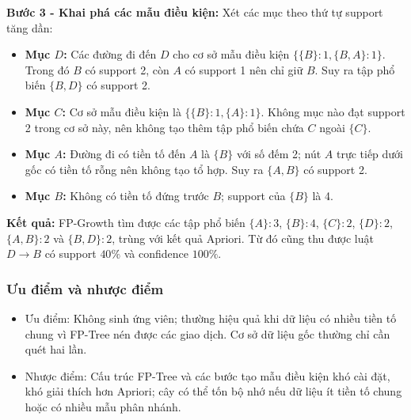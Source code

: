 \textbf{Bước 3 - Khai phá các mẫu điều kiện:} Xét các mục theo thứ tự support tăng dần:
\begin{itemize}
    \item \textbf{Mục $D$:} Các đường đi đến $D$ cho cơ sở mẫu điều kiện $\{\{B\}:1,\{B,A\}:1\}$. Trong đó $B$ có support 2, còn $A$ có support 1 nên chỉ giữ $B$. Suy ra tập phổ biến $\{B,D\}$ có support 2.
    \item \textbf{Mục $C$:} Cơ sở mẫu điều kiện là $\{\{B\}:1,\{A\}:1\}$. Không mục nào đạt support 2 trong cơ sở này, nên không tạo thêm tập phổ biến chứa $C$ ngoài $\{C\}$.
    \item \textbf{Mục $A$:} Đường đi có tiền tố đến $A$ là $\{B\}$ với số đếm 2; nút $A$ trực tiếp dưới gốc có tiền tố rỗng nên không tạo tổ hợp. Suy ra $\{A,B\}$ có support 2.
    \item \textbf{Mục $B$:} Không có tiền tố đứng trước $B$; support của $\{B\}$ là 4.
\end{itemize}

\textbf{Kết quả:} FP-Growth tìm được các tập phổ biến $\{A\}:3$, $\{B\}:4$, $\{C\}:2$, $\{D\}:2$, $\{A,B\}:2$ và $\{B,D\}:2$, trùng với kết quả Apriori. Từ đó cũng thu được luật $D\rightarrow B$ có support $40\%$ và confidence $100\%$.

\subsubsection{Ưu điểm và nhược điểm}
\begin{itemize}
    \item Ưu điểm: Không sinh ứng viên; thường hiệu quả khi dữ liệu có nhiều tiền tố chung vì FP-Tree nén được các giao dịch. Cơ sở dữ liệu gốc thường chỉ cần quét hai lần.
    \item Nhược điểm: Cấu trúc FP-Tree và các bước tạo mẫu điều kiện khó cài đặt, khó giải thích hơn Apriori; cây có thể tốn bộ nhớ nếu dữ liệu ít tiền tố chung hoặc có nhiều mẫu phân nhánh.
\end{itemize}